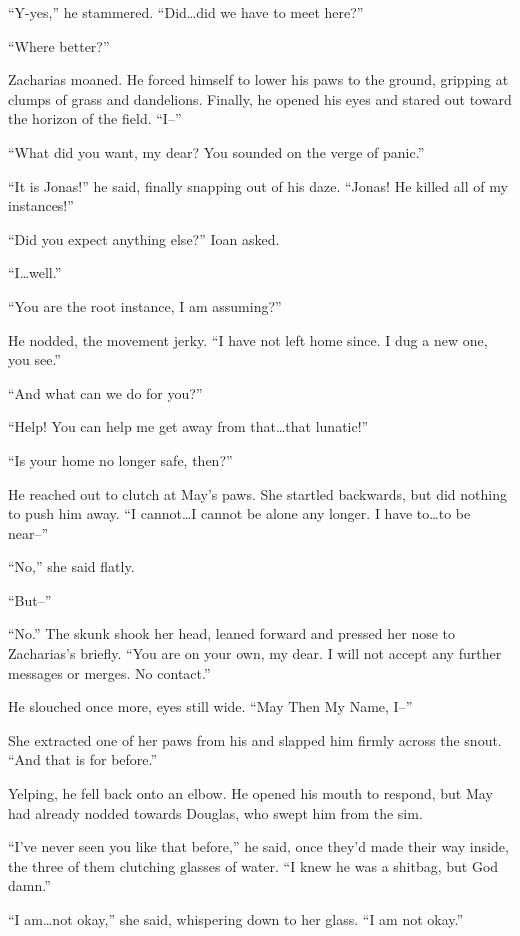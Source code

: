 ``Y-yes,'' he stammered. ``Did\ldots did we have to meet here?''

``Where better?''

Zacharias moaned. He forced himself to lower his paws to the ground, gripping at clumps of grass and dandelions. Finally, he opened his eyes and stared out toward the horizon of the field. ``I--''

``What did you want, my dear? You sounded on the verge of panic.''

``It is Jonas!'' he said, finally snapping out of his daze. ``Jonas! He killed all of my instances!''

``Did you expect anything else?'' Ioan asked.

``I\ldots well.''

``You are the root instance, I am assuming?''

He nodded, the movement jerky. ``I have not left home since. I dug a new one, you see.''

``And what can we do for you?''

``Help! You can help me get away from that\ldots that lunatic!''

``Is your home no longer safe, then?''

He reached out to clutch at May's paws. She startled backwards, but did nothing to push him away. ``I cannot\ldots I cannot be alone any longer. I have to\ldots to be near--''

``No,'' she said flatly.

``But--''

``No.'' The skunk shook her head, leaned forward and pressed her nose to Zacharias's briefly. ``You are on your own, my dear. I will not accept any further messages or merges. No contact.''

He slouched once more, eyes still wide. ``May Then My Name, I--''

She extracted one of her paws from his and slapped him firmly across the snout. ``And that is for before.''

Yelping, he fell back onto an elbow. He opened his mouth to respond, but May had already nodded towards Douglas, who swept him from the sim.

``I've never seen you like that before,'' he said, once they'd made their way inside, the three of them clutching glasses of water. ``I knew he was a shitbag, but God damn.''

``I am\ldots not okay,'' she said, whispering down to her glass. ``I am not okay.''


